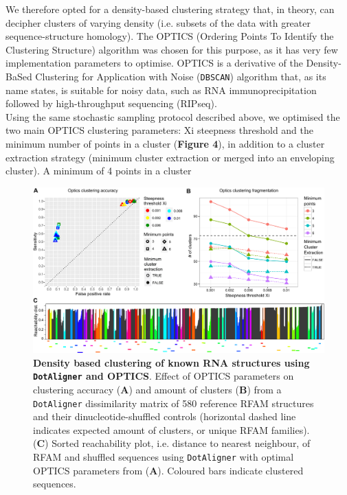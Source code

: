 \documentclass[a4paper,11pt]{article}
\newcommand\dotaligner{\texttt{DotAligner}}
\begin{document}
{We therefore opted for a density-based clustering strategy that, in theory, can decipher 
clusters of varying density (i.e. subsets of the data with greater sequence-structure homology). 
The OPTICS (Ordering Points To Identify the Clustering Structure) algorithm \cite{ankerst99ordering}
was chosen for this purpose, as it has very few implementation parameters to optimise. 
OPTICS is a derivative of the Density-BaSed Clustering for Application with Noise (\texttt{DBSCAN}) 
\cite{ester1996density} algorithm that, as its name states, is suitable for noisy data, 
such as RNA immunoprecipitation followed by high-throughput sequencing (RIPseq).\\

Using the same stochastic sampling protocol described above, we optimised the two main 
OPTICS clustering parameters: Xi steepness threshold 
and the minimum number of points in a cluster (\textbf{Figure 4}), in addition to a cluster 
extraction strategy (minimum cluster extraction or merged into an enveloping cluster). 
A minimum of 4 points in a cluster 


  \begin{figure}
 \includegraphics[width=\textwidth]{fig4}
 \caption { \textbf{Density based clustering of known RNA structures using \dotaligner{} and OPTICS}. Effect of OPTICS parameters on clustering accuracy (\textbf{A}) and amount of clusters (\textbf{B}) from a \dotaligner{} dissimilarity matrix of 580 reference RFAM structures and their dinucleotide-shuffled controls (horizontal dashed line indicates expected amount of clusters, or unique RFAM families). (\textbf{C}) Sorted reachability plot, i.e. distance to nearest neighbour, of RFAM and shuffled sequences using \dotaligner{} with optimal OPTICS parameters from (\textbf{A}). Coloured bars indicate clustered sequences. 
 }
\end{figure}



}
\end{document}
